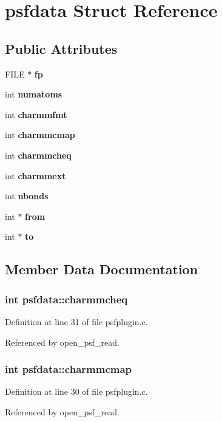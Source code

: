 \section{psfdata  Struct Reference}
\label{structpsfdata}
\subsection*{Public Attributes}
\begin{CompactItemize}
\item 
FILE $\ast$ {\bf fp}
\item 
int {\bf numatoms}
\item 
int {\bf charmmfmt}
\item 
int {\bf charmmcmap}
\item 
int {\bf charmmcheq}
\item 
int {\bf charmmext}
\item 
int {\bf nbonds}
\item 
int $\ast$ {\bf from}
\item 
int $\ast$ {\bf to}
\end{CompactItemize}


\subsection{Member Data Documentation}
\subsubsection{\setlength{\rightskip}{0pt plus 5cm}int psfdata::charmmcheq}\label{structpsfdata_m4}




Definition at line 31 of file psfplugin.c.

Referenced by open\_\-psf\_\-read.
\subsubsection{\setlength{\rightskip}{0pt plus 5cm}int psfdata::charmmcmap}\label{structpsfdata_m3}




Definition at line 30 of file psfplugin.c.

Referenced by open\_\-psf\_\-read.
